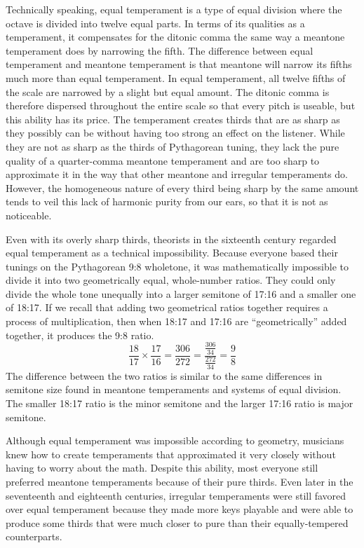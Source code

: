 Technically speaking, equal temperament is a type of equal division where the octave is
divided into twelve equal parts.  In terms of its qualities as a temperament, it
compensates for the ditonic comma the same way a meantone temperament does by narrowing
the fifth. The difference between equal temperament and meantone temperament is that
meantone will narrow its fifths much more than equal temperament.  In equal
temperament, all twelve fifths of the scale are narrowed by a slight but equal amount.
The ditonic comma is therefore dispersed throughout the entire scale so that every
pitch is useable, but this ability has its price.  The temperament creates thirds that
are as sharp as they possibly can be without having too strong an effect on the
listener.  While they are not as sharp as the thirds of Pythagorean tuning, they lack
the pure quality of a quarter-comma meantone temperament and are too sharp to
approximate it in the way that other meantone and irregular temperaments do. However,
the homogeneous nature of every third being sharp by the same amount tends to veil this
lack of harmonic purity from our ears, so that it is not as noticeable.

Even with its overly sharp thirds, theorists in the sixteenth century regarded equal
temperament as a technical impossibility. Because everyone based their tunings on the
Pythagorean 9:8 wholetone, it was mathematically impossible to divide it into two
geometrically equal, whole-number ratios. They could only divide the whole tone
unequally into a larger semitone of 17:16 and a smaller one of 18:17.
\autocite[20]{ML:1} If we recall that adding two geometrical ratios together requires a
process of multiplication, then when 18:17 and 17:16 are ``geometrically'' added
together, it produces the 9:8 ratio.
\begin{equation}
  \frac{18}{17} \times
  \frac{17}{16} =
  \frac{306}{272} =
  \frac{\frac{306}{34}}{\frac{272}{34}} =
  \frac{9}{8}
\end{equation}
The difference between the two ratios is similar to the same differences in semitone size
found in meantone temperaments and systems of equal division.  The smaller 18:17 ratio is
the minor semitone and the larger 17:16 ratio is major semitone.

Although equal temperament was impossible according to geometry, musicians knew how to
create temperaments that approximated it very closely without having to worry about the
math.  Despite this ability, most everyone still preferred meantone temperaments
because of their pure thirds. Even later in the seventeenth and eighteenth centuries,
irregular temperaments were still favored over equal temperament because they made more
keys playable and were able to produce some thirds that were much closer to pure than
their equally-tempered counterparts.

